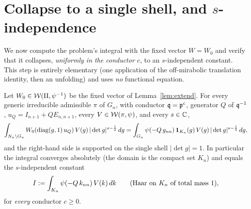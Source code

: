 \section*{Collapse to a single shell, and $s$-independence}

We now compute the problem's integral with the fixed vector $W=W_0$ and verify that it
collapses, \emph{uniformly in the conductor $c$}, to an $s$-independent constant. This step is
entirely elementary \textup{(}one application of the off-mirabolic translation identity, then an
unfolding\textup{)} and uses \emph{no} functional equation.

\begin{qtwolemma}\label{lem:unfold}
Let $W_0\in\mathcal{W}(\Pi,\psi^{-1})$ be the fixed vector of Lemma~\ref{lem:extend}. For every
generic irreducible admissible $\pi$ of $G_n$, with conductor $\mathfrak{q}=\mathfrak{p}^{c}$, generator
$Q$ of $\mathfrak{q}^{-1}$, $u_Q=I_{n+1}+QE_{n,n+1}$, every $V\in\mathcal{W}(\pi,\psi)$, and every
$s\in\mathbb{C}$,
\[
\int_{N_n\backslash G_n} W_0(\operatorname{diag}(g,1)\,u_Q)\,V(g)\,|\det g|^{s-\frac12}\,dg
=\int_{G_n}\psi(-Q\,g_{nn})\,\mathbf 1_{K_n}(g)\,V(g)\,|\det g|^{s-\frac12}\,dg ,
\]
and the right-hand side is supported on the single shell $|\det g|=1$. In particular the
integral converges absolutely \textup{(}the domain is the compact set $K_n$\textup{)} and equals
the $s$-independent constant
\begin{equation}\label{eq:Idef}
I:=\int_{K_n}\psi(-Q\,k_{nn})\,V(k)\,dk\qquad\textup{(Haar on $K_n$ of total mass $1$),}
\end{equation}
for \emph{every} conductor $c\ge0$.
\end{qtwolemma}

